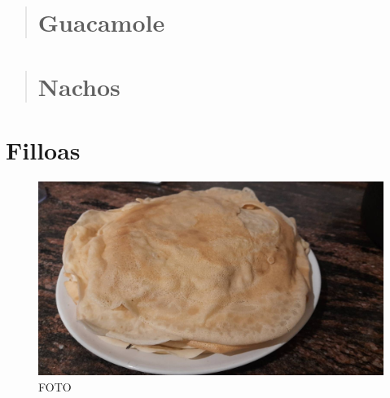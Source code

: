 \documentclass[
]{book}
\begin{document}
\begin{quote}
\hypertarget{guacamole}{%
\chapter{Guacamole}\label{guacamole}}
\end{quote}

\begin{quote}
\hypertarget{nachos}{%
\chapter{Nachos}\label{nachos}}
\end{quote}

\hypertarget{filloas}{%
\chapter{Filloas}\label{filloas}}

\begin{figure}
\centering
\includegraphics{images/filloas.jpeg}
\caption{FOTO}
\end{figure}
\end{document}
